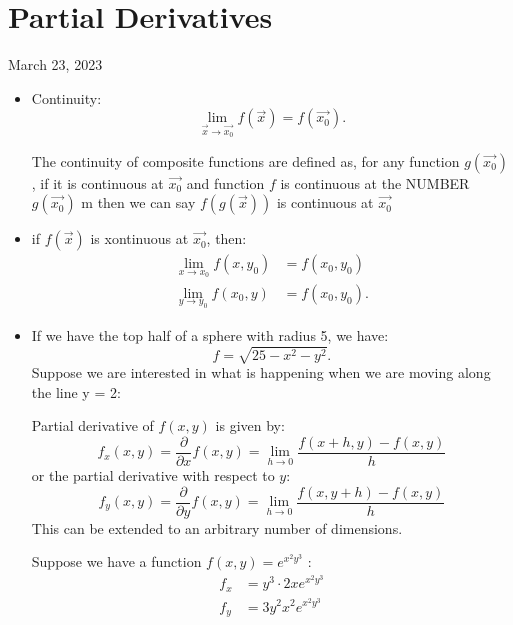 \newpage
\section{Partial Derivatives}
March 23, 2023
\begin{itemize}
	\item Continuity:
\[
			\lim_{\vec{x} \to \vec{x_0}} f\left( \vec{x} \right)  = f\left( \vec{x_0} \right) 
			.\] 
		\begin{theorem}
			The continuity of composite functions are defined as, for any function $g\left( \vec{x_0} \right) $, if it is continuous at $\vec{x_0}$ and function $f$ is continuous at the NUMBER $g\left( \vec{x_0} \right) $ m then we can say $f\left( g\left( \vec{x} \right)  \right) $ is continuous at $\vec{x_0}$
		\end{theorem}
	\item if $f\left( \vec{x} \right) $ is xontinuous at $\vec{x_0}$, then:
		\begin{align*}
			\lim_{x \to x_0} f\left( x, y_0 \right)  &=  f\left( x_0, y_0 \right)\\
			\lim_{y \to y_0}  f\left( x_0, y \right)  &= f\left( x_0, y_0 \right) 
		.\end{align*}
	\item If we have the top half of a sphere with radius 5, we have:
		\[
		f = \sqrt{25 - x^2 -y^2} 
		.\] 
		Suppose we are interested in what is happening when we are moving along the line y = 2:
		\begin{definition}
			Partial derivative of $f\left( x,y \right) $ is given by:
			\begin{equation}
				f_{x}\left( x, y \right)  = \frac{\partial}{\partial x} f\left( x,y \right)  = \lim_{h \to 0} \frac{f\left( x+h, y \right) -f\left( x,y \right) }{h}
			\end{equation}
			or the partial derivative with respect to $y$:
			\begin{equation}
				f_y\left( x,y \right)  = \frac{\partial }{\partial y} f\left( x, y \right)  = \lim_{h \to 0} \frac{f\left( x,y+h \right) -f\left( x,y \right) }{h}
			\end{equation}
			This can be extended to an arbitrary number of dimensions.
		\end{definition}
		\begin{example}
			Suppose we have a function $f\left( x,y \right)  = e^{x^2y^3}$ :
			\begin{align*}
				f_x &= y^3\cdot 2xe^{x^2y^3}\\
				f_y &= 3y^2x^2e^{x^2y^3} \\

\end{align*}
\end{example}
\end{itemize}
